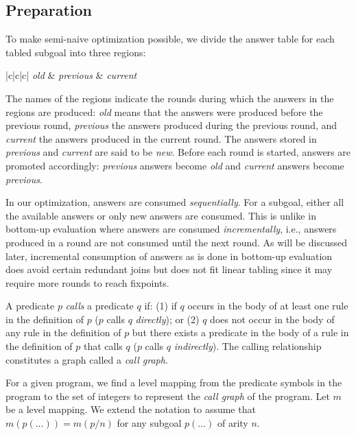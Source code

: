 \documentclass{tlp}
\begin{document}
\subsection{Preparation}
To make semi-naive optimization possible, we divide the answer table for each tabled subgoal into three regions: 
\begin{center}
\begin{oldtabular}{|c|c|c|} \oldhline
{\it old} & {\it previous} & {\it current} \\ \oldhline
\end{oldtabular}
\end{center}

\noindent
The names of the regions indicate the rounds during which the answers in the regions are produced: {\it old} means that the answers were produced before the previous round, {\it previous} the answers produced during the previous round, and {\it current} the answers produced in the current round. The answers stored in {\it previous} and {\it current} are said to be {\it new}. Before each round is started, answers are promoted accordingly: {\it previous} answers become {\it old} and {\it current} answers become {\it previous}. 

In our optimization, answers are consumed {\it sequentially}. For a subgoal, either all the available answers or only new answers are consumed. This is unlike in bottom-up evaluation where answers are consumed {\it incrementally}, i.e., answers produced in a round are not consumed until the next round. As will be discussed later, incremental consumption of answers as is done in bottom-up evaluation does avoid certain redundant joins but does not fit linear tabling since it may require more rounds to reach fixpoints.

A predicate $p$ {\it calls} a predicate $q$ if: (1) if $q$ occurs in the body of at least one rule in the definition of $p$ ($p$ calls $q$ {\it directly}); or (2) $q$ does not occur in the body of any rule in the definition of $p$ but there exists a predicate in the body of a rule in the definition of $p$ that calls $q$ ($p$ calls $q$ {\it indirectly}). The calling relationship constitutes a graph called a {\it call graph}.

For a given program, we find a level mapping from the predicate symbols in the program to the set of integers to represent the {\it call graph} of the program. Let $m$ be a level mapping. We extend the notation to assume that $m(p(\ldots))=m(p/n)$ for any subgoal $p(\ldots)$ of arity $n$.
\end{document}
